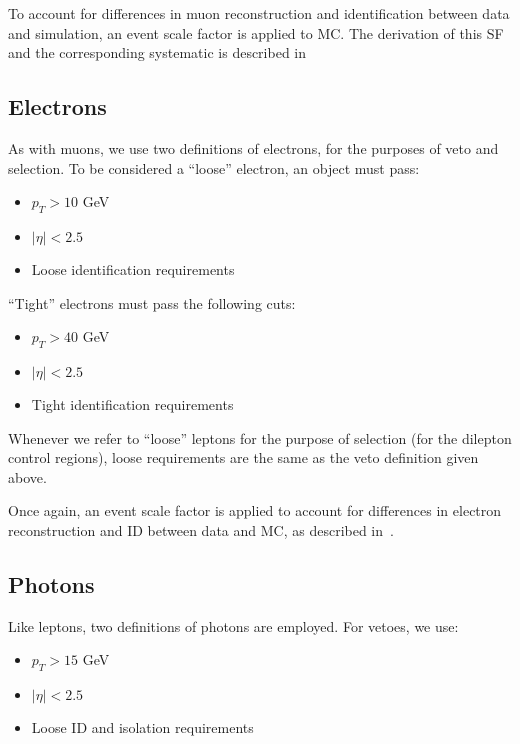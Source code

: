 To account for differences in muon reconstruction and identification between data and simulation, an event scale factor is applied to MC. The derivation of this SF and the corresponding systematic is described in~\cite{CMS_AN_2016-473}

\subsection{Electrons}
\label{subsec:electrons}

As with muons, we use two definitions of electrons, for the purposes of veto and selection.
To be considered a ``loose'' electron, an object must pass:
\begin{itemize}
  \item $p_T>10$ GeV
  \item $|\eta|<2.5$
  \item Loose identification requirements \cite{CMS-EGM-TWIKI-ELEID}
\end{itemize}
``Tight'' electrons must pass the following cuts:
\begin{itemize}
  \item $p_T>40$ GeV
  \item $|\eta|<2.5$
  \item Tight identification requirements \cite{CMS-EGM-TWIKI-ELEID}
\end{itemize}

Whenever we refer to ``loose'' leptons for the purpose of selection (for the dilepton control regions), loose requirements are the same as the veto definition given above.

Once again, an event scale factor is applied to account for differences in electron reconstruction and ID between data and MC, as described in~\cite{CMS_AN_2016-473}.

\subsection{Photons}
\label{subsec:photons}
Like leptons, two definitions of photons are employed. For vetoes, we use:
\begin{itemize}
  \item $p_T>15$ GeV
  \item $|\eta|<2.5$
  \item Loose ID and isolation requirements \cite{CMS-PHO-TWIKI-ID}
\end{itemize}

